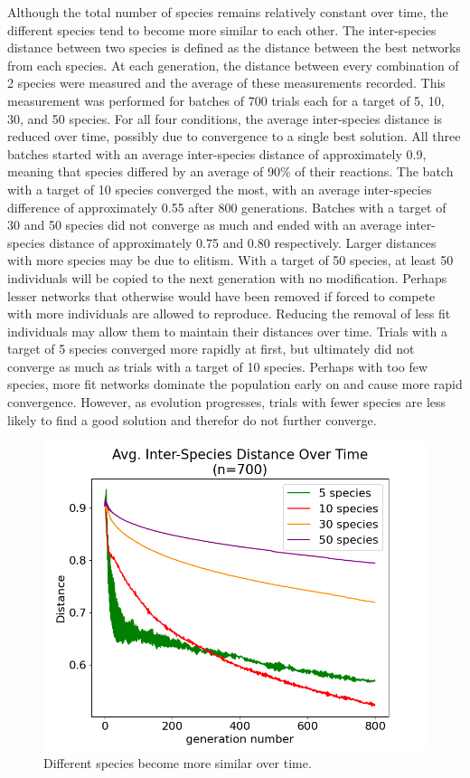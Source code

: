 \documentclass[12pt]{report}
\begin{document}
Although the total number of species remains relatively constant over time, the different species tend to become more similar to each other. The inter-species distance between two species is defined as the distance between the best networks from each species. At each generation, the distance between every combination of 2 species were measured and the average of these measurements recorded. This measurement was performed for batches of 700 trials each for a target of 5, 10, 30, and 50 species. For all four conditions, the average inter-species distance is reduced over time, possibly due to convergence to a single best solution. All three batches started with an average inter-species distance of approximately 0.9, meaning that species differed by an average of 90\% of their reactions. The batch with a target of 10 species converged the most, with an average inter-species difference of approximately 0.55 after 800 generations.   Batches with a target of 30 and 50 species did not converge as much and ended with an average inter-species distance of approximately 0.75 and 0.80 respectively. Larger distances with more species may be due to elitism. With a target of 50 species, at least 50 individuals will be copied to the next generation with no modification. Perhaps lesser networks that otherwise would have been removed if forced to compete with more individuals are allowed to reproduce. Reducing the removal of less fit individuals may allow them to maintain their distances over time. Trials with a target of 5 species converged more rapidly at first, but ultimately did not converge as much as trials with a target of 10 species. Perhaps with too few species, more fit networks dominate the population early on and cause more rapid convergence. However, as evolution progresses, trials with fewer species are less likely to find a good solution and therefor do not further converge.

\begin{figure}
\centering
    \includegraphics[width=15cm]{images/avg_species_differences.png}
    \caption[Average inter-species distance over time]{Different species become more similar over time.}
    \label{fig:avg_species_differences}
\end{figure}
\end{document}
